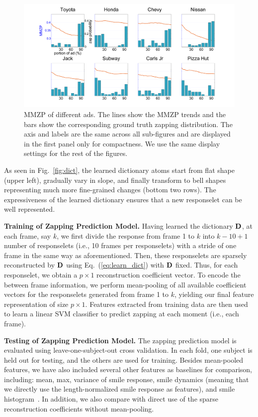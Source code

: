 \documentclass[twoside,leqno,twocolumn]{article}
\begin{document}
\begin{figure}[t]
	\centering
		\includegraphics[width=.8\textwidth]{fig/ad.png}
	\caption{MMZP of different ads. The lines show the MMZP trends and the bars show the corresponding ground truth zapping distribution. The axis and labels are the same across all sub-figures and are displayed in the first panel only for compactness. We use the same display settings for the rest of the figures.}
	\label{fig:ad}
\end{figure}

As seen in Fig.~\ref{fig:dict}, the learned dictionary atoms start from flat shape (upper left), gradually vary in slope, and finally transform to bell shapes representing much more fine-grained changes (bottom two rows). The expressiveness of the learned dictionary ensures that a new responselet can be well represented. 


\noindent \textbf{Training of Zapping Prediction Model.} Having learned the dictionary ${\bf D}$, at each frame, say $k$, we first divide the response from frame 1 to $k$ into $k-10+1$ number of responselets (i.e., 10 frames per responselets) with a stride of one frame in the same way as aforementioned. Then, these responselets are sparsely reconstructed by ${\bf D}$ using Eq.~(\ref{eq:learn_dict}) with ${\bf D}$ fixed. Thus, for each responselet, we obtain a $p\times 1$ reconstruction coefficient vector. To encode the between frame information, we perform mean-pooling of all available coefficient vectors for the responselets generated from frame 1 to $k$, yielding our final feature representation of size $p\times 1$. Features extracted from training data are then used to learn a linear SVM classifier to predict zapping at each moment (i.e., each frame).

\noindent \textbf{Testing of Zapping Prediction Model.} The zapping prediction model is evaluated using leave-one-subject-out cross validation. In each fold, one subject is held out for testing, and the others are used for training. Besides mean-pooled features, we have also included several other features as baselines for comparison,  including: mean, max, variance of smile response, smile dynamics (meaning that we directly use the length-normalized smile response as features), and smile histogram~\cite{Yang_TAC14}. In addition, we also compare with direct use of the sparse reconstruction coefficients without mean-pooling.
\end{document}
